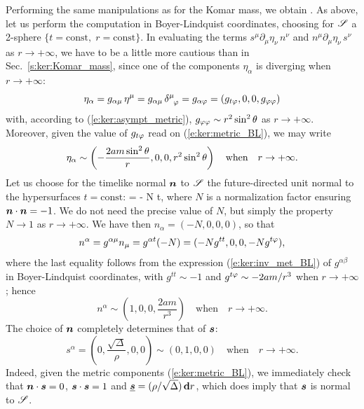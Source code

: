 Performing the same manipulations as for the Komar mass, we obtain
\be \label{e:ker:J_Komar_partial_der}
     .
\ee
As above, let us perform the computation in Boyer-Lindquist coordinates, choosing
for $\mathscr{S}$ a 2-sphere $\{t=\mathrm{const},\; r=\mathrm{const}\}$.
In evaluating the terms $s^\mu \partial_\mu \eta_\nu \, n^\nu$
and $n^\mu \partial_\mu \eta_\nu \, s^\nu$ as $r\rightarrow+\infty$, we have
to be a little more cautious than in Sec.~\ref{s:ker:Komar_mass}, since
one of
the components $\eta_\alpha$ is diverging when $r\rightarrow+\infty$:
\[
    \eta_\alpha = g_{\alpha\mu} \, \eta^\mu = g_{\alpha\mu} \, \delta^\mu_{\ \, \varphi}
        = g_{\alpha\varphi} = (g_{t\varphi},0,0,g_{\varphi\varphi})
\]
with, according to (\ref{e:ker:asympt_metric}),
$g_{\varphi\varphi} \sim r^2\sin^2\theta$ as $r\rightarrow+\infty$.
Moreover, given the value of $g_{t\varphi}$ read on (\ref{e:ker:metric_BL}), we may
write
\[
    \eta_\alpha \sim \left( - \frac{2 a m \sin^2\theta}{r}, 0, 0, r^2\sin^2\theta \right)
        \quad\mbox{when}\quad
        r\rightarrow+\infty .
\]
Let us choose for the timelike normal $\bm{n}$ to $\mathscr{S}$
the future-directed unit normal to the hypersurfaces $t=\mathrm{const}$:
\be
  = - N \dd t,
\ee
where $N$ is a normalization factor ensuring $\bm{n}\cdot\bm{n}=-1$.
We do not need the precise value of $N$, but simply the property $N\rightarrow 1$
as $r\rightarrow+\infty$.
We have then
$n_\alpha = (-N,0,0,0)$, so that
\[
    n^\alpha = g^{\alpha\mu} n_\mu = g^{\alpha t} (-N) =
    (- N g^{tt}, 0, 0, - N g^{t\varphi} ),
\]
where the last equality follows from the
expression (\ref{e:ker:inv_met_BL}) of $g^{\alpha\beta}$ in
Boyer-Lindquist coordinates, with $g^{tt} \sim -1$ and
$g^{t\varphi} \sim - 2 a m / r^3$ when $r\rightarrow+\infty$; hence
\[
    n^\alpha \sim \left( 1, 0, 0, \frac{2 a m}{r^3} \right)  \quad\mbox{when}\quad
        r\rightarrow+\infty .
\]
The choice of $\bm{n}$ completely determines that of $\bm{s}$:
\[
    s^\alpha = \left( 0, \frac{\sqrt{\Delta}}{\rho}, 0, 0 \right)
        \sim (0,1,0,0) \quad\mbox{when}\quad r\rightarrow+\infty .
\]
Indeed, given the metric components (\ref{e:ker:metric_BL}), we immediately
check that $\bm{n}\cdot\bm{s}=0$, $\bm{s}\cdot\bm{s}=1$ and
$\underline{\bm{s}} = (\rho/\sqrt{\Delta})\, \mathbf{d} r$, which does imply that $\bm{s}$ is normal to $\mathscr{S}$.

